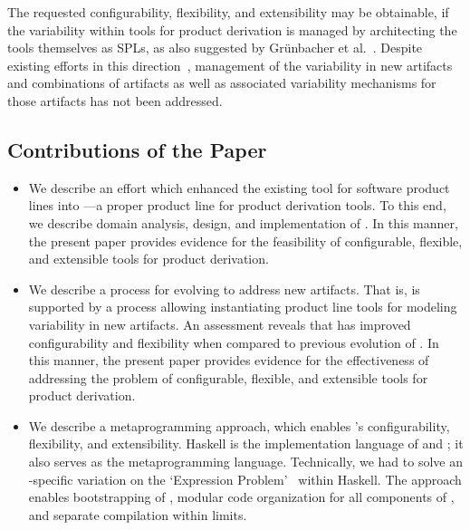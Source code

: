 

The requested configurability, flexibility, and extensibility may be obtainable, if the variability within tools for product derivation is managed by architecting the tools themselves as SPLs, as also suggested by Gr{\"u}nbacher et al.~\cite{grunbacher:2008}. Despite existing efforts in this direction~\cite{grunbacher:2011,grunbacher:2008,batory-ahead-bootstrap}, management of the variability in new artifacts and combinations of artifacts as well as associated variability mechanisms for those artifacts has not been addressed. 


\subsection*{Contributions of the Paper}

\begin{itemize}

\item We describe an effort which enhanced the existing \hp{} tool for software product lines into \hpl---a proper
  product line for product derivation tools. To this end, we describe domain analysis, design, and implementation of \hpl. In this manner, the present paper provides evidence for the feasibility of configurable, flexible, and extensible tools for product derivation.

\item We describe a process for evolving \hpl{} to address new artifacts. That is, \hpl{} is supported by a process allowing instantiating product line tools for modeling variability in new artifacts. An assessment reveals that \hpl{} has improved configurability and flexibility when compared to previous evolution of \hp. In this manner, the present paper provides evidence for the effectiveness of addressing the problem of configurable, flexible, and extensible tools for product derivation.

\item We describe a metaprogramming approach, which enables \hpl's configurability, flexibility, and extensibility.  Haskell is the implementation language of \hp{} and \hpl{}; it also serves as the metaprogramming language.  Technically, we had to solve an \hp-specific variation on the `Expression Problem'~\cite{Wadler98,Lopez-HerrejonBC05} within Haskell. The approach enables bootstrapping of \hpl{}, modular code organization for all components of \hpl{}, and separate compilation within limits.

\end{itemize}

